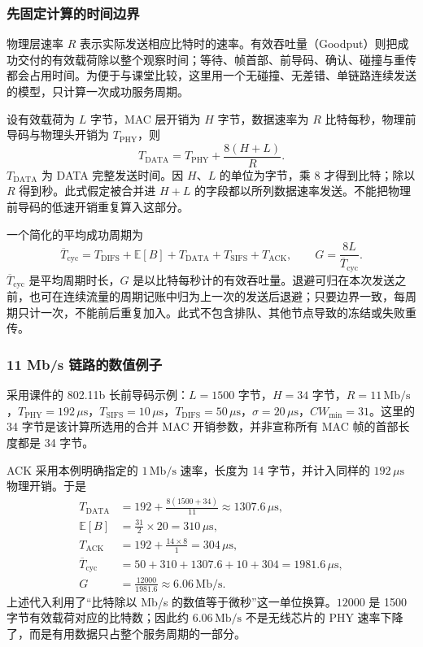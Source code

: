 \subsubsection{先固定计算的时间边界}

物理层速率 $R$ 表示实际发送相应比特时的速率。有效吞吐量（Goodput）则把成功交付的有效载荷除以整个观察时间；等待、帧首部、前导码、确认、碰撞与重传都会占用时间。为便于与课堂比较，这里用一个无碰撞、无差错、单链路连续发送的模型，只计算一次成功服务周期。

设有效载荷为 $L$ 字节，MAC 层开销为 $H$ 字节，数据速率为 $R$ 比特每秒，物理前导码与物理头开销为 $T_{\mathrm{PHY}}$，则
\begin{equation}
T_{\mathrm{DATA}}=T_{\mathrm{PHY}}+\frac{8(H+L)}{R}.
\label{eq:data-airtime}
\end{equation}
$T_{\mathrm{DATA}}$ 为 DATA 完整发送时间。因 $H$、$L$ 的单位为字节，乘 8 才得到比特；除以 $R$ 得到秒。此式假定被合并进 $H+L$ 的字段都以所列数据速率发送。不能把物理前导码的低速开销重复算入这部分。

一个简化的平均成功周期为
\begin{equation}
\overline{T}_{\mathrm{cyc}}=T_{\mathrm{DIFS}}+\mathbb{E}[B]+T_{\mathrm{DATA}}
+T_{\mathrm{SIFS}}+T_{\mathrm{ACK}},\qquad
G=\frac{8L}{\overline{T}_{\mathrm{cyc}}}.
\label{eq:goodput-cycle}
\end{equation}
$\overline{T}_{\mathrm{cyc}}$ 是平均周期时长，$G$ 是以比特每秒计的有效吞吐量。退避可归在本次发送之前，也可在连续流量的周期记账中归为上一次的发送后退避；只要边界一致，每周期只计一次，不能前后重复加入。此式不包含排队、其他节点导致的冻结或失败重传。

\subsubsection{11 Mb/s 链路的数值例子}

采用课件的 802.11b 长前导码示例：$L=1500$ 字节，$H=34$ 字节，$R=11\,\mathrm{Mb/s}$，$T_{\mathrm{PHY}}=192\,\mu\mathrm{s}$，$T_{\mathrm{SIFS}}=10\,\mu\mathrm{s}$，$T_{\mathrm{DIFS}}=50\,\mu\mathrm{s}$，$\sigma=20\,\mu\mathrm{s}$，$CW_{\min}=31$。这里的 34 字节是该计算所选用的合并 MAC 开销参数，并非宣称所有 MAC 帧的首部长度都是 34 字节。

ACK 采用本例明确指定的 $1\,\mathrm{Mb/s}$ 速率，长度为 14 字节，并计入同样的 $192\,\mu\mathrm{s}$ 物理开销。于是
\begin{align*}
T_{\mathrm{DATA}}&=192+\frac{8(1500+34)}{11}
\approx1307.6\,\mu\mathrm{s},\\
\mathbb{E}[B]&=\frac{31}{2}\times20=310\,\mu\mathrm{s},\\
T_{\mathrm{ACK}}&=192+\frac{14\times8}{1}=304\,\mu\mathrm{s},\\
\overline{T}_{\mathrm{cyc}}&=50+310+1307.6+10+304
=1981.6\,\mu\mathrm{s},\\
G&=\frac{12000}{1981.6}\approx6.06\,\mathrm{Mb/s}.
\end{align*}
上述代入利用了“比特除以 Mb/s 的数值等于微秒”这一单位换算。$12000$ 是 1500 字节有效载荷对应的比特数；因此约 $6.06\,\mathrm{Mb/s}$ 不是无线芯片的 PHY 速率下降了，而是有用数据只占整个服务周期的一部分。

